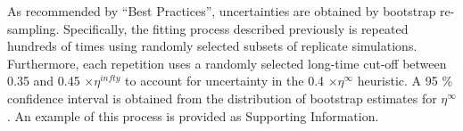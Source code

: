\documentclass[preprint,review,12pt]{elsarticle}
\begin{document}
	As recommended by ``Best Practices'', uncertainties are obtained by bootstrap re-sampling. Specifically, the fitting process described previously is repeated hundreds of times using randomly selected subsets of replicate simulations. Furthermore, each repetition uses a randomly selected long-time cut-off between 0.35 and 0.45 $\times \eta^{infty}$ to account for uncertainty in the 0.4 $\times \eta^{\infty}$ heuristic. A 95 \% confidence interval is obtained from the distribution of bootstrap estimates for $\eta^\infty$. An example of this process is provided as Supporting Information.
	
	
	
	
\end{document}
